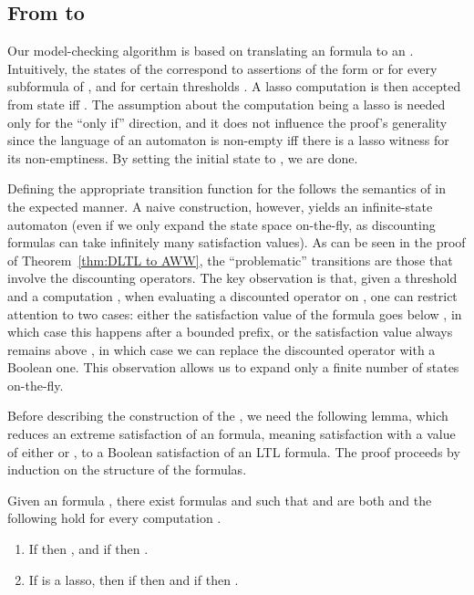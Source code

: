 \documentclass{llncs}
\begin{document}
\subsection{From  to }\label{sec:DltlToAww}
Our model-checking algorithm is based on translating an  formula  to an .
Intuitively, the states of the  correspond to assertions of the form  or  for every subformula  of , and for certain thresholds . 
A lasso computation is then accepted from state  iff . The assumption about the computation being a lasso is needed only for the ``only if'' direction, and it does not influence the proof's generality since the language of an automaton is non-empty iff there is a lasso witness for its non-emptiness. By setting the initial state to , we are done. 

Defining the appropriate transition function for the  follows the semantics of  in the expected manner. A naive construction, however, yields an infinite-state automaton (even if we only expand the state space on-the-fly, as discounting formulas can take infinitely many satisfaction values).
As can be seen in the proof of Theorem~\ref{thm:DLTL to AWW}, the ``problematic'' transitions are those that involve the discounting operators. The key observation is that, given a threshold  and a computation , when evaluating a discounted operator on , one can restrict attention to two cases: either the satisfaction value of the formula goes below , in which case this happens after a bounded prefix, or the satisfaction value always remains above , in which case we can replace the discounted operator with a Boolean one. This observation allows us to expand only a finite number of states on-the-fly.

Before describing the construction of the , we need the following lemma, which reduces an extreme satisfaction of an  formula, meaning satisfaction with a value of either  or , to a Boolean satisfaction of an LTL formula. The proof proceeds by induction on the structure of the formulas.
\begin{lemma}
\label{lem:LTL for positive}
Given an  formula , there exist  formulas  and  such that  and  are both  and the following hold for every computation .
\begin{enumerate}
\item If  then , and if  then .
\item If  is a lasso, then if  then  and if  then .
\end{enumerate} 
\end{lemma}
\end{document}
